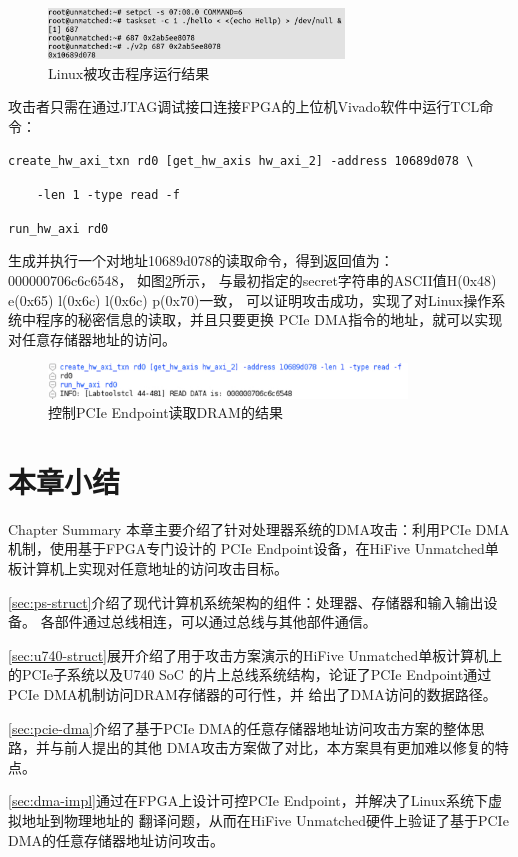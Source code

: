 \begin{figure}[ht]
	\centering
	\includegraphics[width=0.7\textwidth]{figs/unmatched.png}
	\caption{Linux被攻击程序运行结果}
	\label{fig:unmatched-output}
\end{figure}

攻击者只需在通过JTAG调试接口连接FPGA的上位机Vivado软件中运行TCL命令：

\verb|create_hw_axi_txn rd0 [get_hw_axis hw_axi_2] -address 10689d078 \|

\verb|    -len 1 -type read -f|

\verb|run_hw_axi rd0|

\noindent 生成并执行一个对地址10689d078的读取命令，得到返回值为：000000706c6c6548，
如图\ref{fig:vivado-output}所示，
与最初指定的secret字符串的ASCII值H(0x48) e(0x65) l(0x6c) l(0x6c) p(0x70)一致，
可以证明攻击成功，实现了对Linux操作系统中程序的秘密信息的读取，并且只要更换
PCIe DMA指令的地址，就可以实现对任意存储器地址的访问。

\begin{figure}[ht]
	\centering
	\includegraphics[width=0.85\textwidth]{figs/vivado.png}
	\caption{控制PCIe Endpoint读取DRAM的结果}
	\label{fig:vivado-output}
\end{figure}

\section{本章小结}{Chapter Summary}
本章主要介绍了针对处理器系统的DMA攻击：利用PCIe DMA机制，使用基于FPGA专门设计的
PCIe Endpoint设备，在HiFive Unmatched单板计算机上实现对任意地址的访问攻击目标。

\ref{sec:ps-struct}介绍了现代计算机系统架构的组件：处理器、存储器和输入输出设备。
各部件通过总线相连，可以通过总线与其他部件通信。

\ref{sec:u740-struct}展开介绍了用于攻击方案演示的HiFive Unmatched单板计算机上的PCIe子系统以及U740 SoC
的片上总线系统结构，论证了PCIe Endpoint通过PCIe DMA机制访问DRAM存储器的可行性，并
给出了DMA访问的数据路径。

\ref{sec:pcie-dma}介绍了基于PCIe DMA的任意存储器地址访问攻击方案的整体思路，并与前人提出的其他
DMA攻击方案做了对比，本方案具有更加难以修复的特点。

\ref{sec:dma-impl}通过在FPGA上设计可控PCIe Endpoint，并解决了Linux系统下虚拟地址到物理地址的
翻译问题，从而在HiFive Unmatched硬件上验证了基于PCIe DMA的任意存储器地址访问攻击。


\newpage
